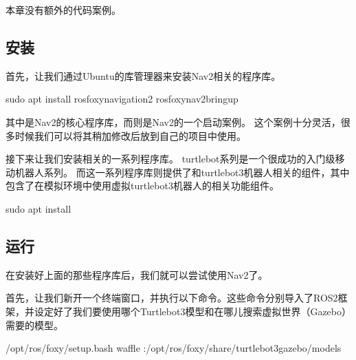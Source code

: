 \documentclass[letterpaper,10pt,english]{sphinxmanual}
\begin{document}
\sphinxAtStartPar
本章没有额外的代码案例。


\subsection{安装}
\label{\detokenize{chapter_rl_sys/control_code_ex:id2}}
\sphinxAtStartPar
首先，让我们通过Ubuntu的库管理器来安装Nav2相关的程序库。

\begin{sphinxVerbatim}[commandchars=\\\{\}]
sudo apt install ros\PYGZhy{}foxy\PYGZhy{}navigation2 ros\PYGZhy{}foxy\PYGZhy{}nav2\PYGZhy{}bringup
\end{sphinxVerbatim}

\sphinxAtStartPar
其中是Nav2的核心程序库，而则是Nav2的一个启动案例。
这个案例十分灵活，很多时候我们可以将其稍加修改后放到自己的项目中使用。

\sphinxAtStartPar
接下来让我们安装相关的一系列程序库。
turtlebot系列是一个很成功的入门级移动机器人系列。
而这一系列程序库则提供了和turtlebot3机器人相关的组件，其中包含了在模拟环境中使用虚拟turtlebot3机器人的相关功能组件。

\begin{sphinxVerbatim}[commandchars=\\\{\}]
sudo apt install 
\end{sphinxVerbatim}


\subsection{运行}
\label{\detokenize{chapter_rl_sys/control_code_ex:id3}}
\sphinxAtStartPar
在安装好上面的那些程序库后，我们就可以尝试使用Nav2了。

\sphinxAtStartPar
首先，让我们新开一个终端窗口，并执行以下命令。这些命令分别导入了ROS2框架，并设定好了我们要使用哪个Turtlebot3模型和在哪儿搜索虚拟世界（Gazebo）需要的模型。

\begin{sphinxVerbatim}[commandchars=\\\{\}]
 /opt/ros/foxy/setup.bash
 waffle
 :/opt/ros/foxy/share/turtlebot3\PYGZus{}gazebo/models
\end{sphinxVerbatim}
\end{document}
